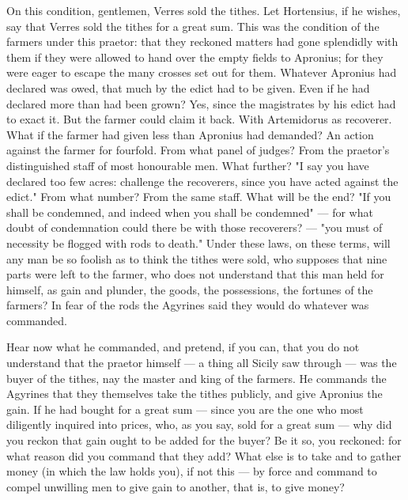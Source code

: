  On this condition, gentlemen, Verres sold the tithes. Let Hortensius, if he wishes, say that Verres sold the tithes for a great sum. This was the condition of the farmers under this praetor: that they reckoned matters had gone splendidly with them if they were allowed to hand over the empty fields to Apronius; for they were eager to escape the many crosses set out for them. Whatever Apronius had declared was owed, that much by the edict had to be given. Even if he had declared more than had been grown? Yes, since the magistrates by his edict had to exact it. But the farmer could claim it back. With Artemidorus as recoverer. What if the farmer had given less than Apronius had demanded? An action against the farmer for fourfold. From what panel of judges? From the praetor's distinguished staff of most honourable men. What further? "I say you have declared too few acres: challenge the recoverers, since you have acted against the edict." From what number? From the same staff. What will be the end? "If you shall be condemned, and indeed when you shall be condemned" --- for what doubt of condemnation could there be with those recoverers? --- "you must of necessity be flogged with rods to death." Under these laws, on these terms, will any man be so foolish as to think the tithes were sold, who supposes that nine parts were left to the farmer, who does not understand that this man held for himself, as gain and plunder, the goods, the possessions, the fortunes of the farmers? In fear of the rods the Agyrines said they would do whatever was commanded.

 Hear now what he commanded, and pretend, if you can, that you do not understand that the praetor himself --- a thing all Sicily saw through --- was the buyer of the tithes, nay the master and king of the farmers. He commands the Agyrines that they themselves take the tithes publicly, and give Apronius the gain. If he had bought for a great sum --- since you are the one who most diligently inquired into prices, who, as you say, sold for a great sum --- why did you reckon that gain ought to be added for the buyer? Be it so, you reckoned: for what reason did you command that they add? What else is to take and to gather money (in which the law holds you), if not this --- by force and command to compel unwilling men to give gain to another, that is, to give money?

